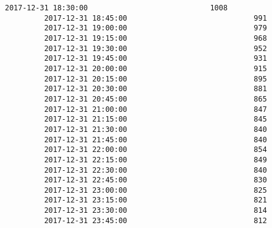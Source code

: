 \documentclass[11pt]{article}
\begin{document}
\begin{Verbatim}[commandchars=\\\{\}]
         2017-12-31 18:30:00                            1008   
         2017-12-31 18:45:00                             991   
         2017-12-31 19:00:00                             979   
         2017-12-31 19:15:00                             968   
         2017-12-31 19:30:00                             952   
         2017-12-31 19:45:00                             931   
         2017-12-31 20:00:00                             915   
         2017-12-31 20:15:00                             895   
         2017-12-31 20:30:00                             881   
         2017-12-31 20:45:00                             865   
         2017-12-31 21:00:00                             847   
         2017-12-31 21:15:00                             845   
         2017-12-31 21:30:00                             840   
         2017-12-31 21:45:00                             840   
         2017-12-31 22:00:00                             854   
         2017-12-31 22:15:00                             849   
         2017-12-31 22:30:00                             840   
         2017-12-31 22:45:00                             830   
         2017-12-31 23:00:00                             825   
         2017-12-31 23:15:00                             821   
         2017-12-31 23:30:00                             814   
         2017-12-31 23:45:00                             812   
         

\end{Verbatim}
\end{document}
